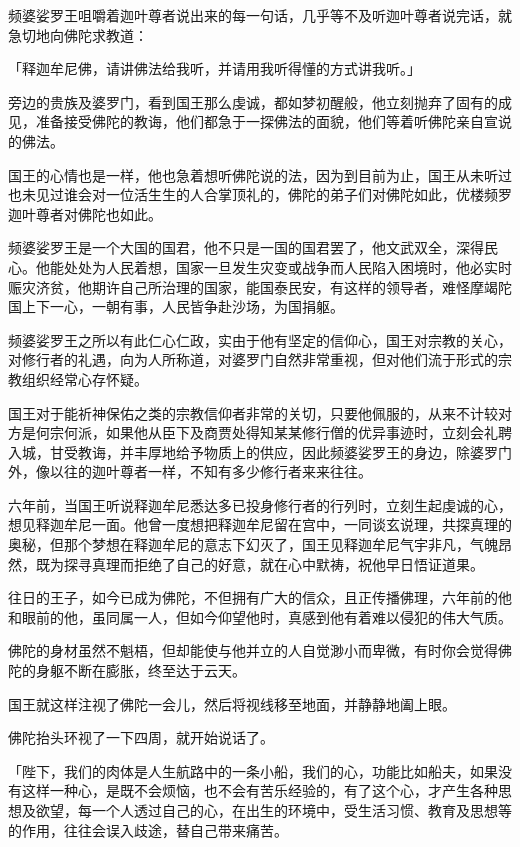 \documentclass[twoside,openany]{book}
\begin{document}
频婆娑罗王咀嚼着迦叶尊者说出来的每一句话，几乎等不及听迦叶尊者说完话，就急切地向佛陀求教道：

「释迦牟尼佛，请讲佛法给我听，并请用我听得懂的方式讲我听。」

旁边的贵族及婆罗门，看到国王那么虔诚，都如梦初醒般，他立刻抛弃了固有的成见，准备接受佛陀的教诲，他们都急于一探佛法的面貌，他们等着听佛陀亲自宣说的佛法。

国王的心情也是一样，他也急着想听佛陀说的法，因为到目前为止，国王从未听过也未见过谁会对一位活生生的人合掌顶礼的，佛陀的弟子们对佛陀如此，优楼频罗迦叶尊者对佛陀也如此。

频婆娑罗王是一个大国的国君，他不只是一国的国君罢了，他文武双全，深得民心。他能处处为人民着想，国家一旦发生灾变或战争而人民陷入困境时，他必实时赈灾济贫，他期许自己所治理的国家，能国泰民安，有这样的领导者，难怪摩竭陀国上下一心，一朝有事，人民皆争赴沙场，为国捐躯。

频婆娑罗王之所以有此仁心仁政，实由于他有坚定的信仰心，国王对宗教的关心，对修行者的礼遇，向为人所称道，对婆罗门自然非常重视，但对他们流于形式的宗教组织经常心存怀疑。

国王对于能祈神保佑之类的宗教信仰者非常的关切，只要他佩服的，从来不计较对方是何宗何派，如果他从臣下及商贾处得知某某修行僧的优异事迹时，立刻会礼聘入城，甘受教诲，并丰厚地给予物质上的供应，因此频婆娑罗王的身边，除婆罗门外，像以往的迦叶尊者一样，不知有多少修行者来来往往。

六年前，当国王听说释迦牟尼悉达多已投身修行者的行列时，立刻生起虔诚的心，想见释迦牟尼一面。他曾一度想把释迦牟尼留在宫中，一同谈玄说理，共探真理的奥秘，但那个梦想在释迦牟尼的意志下幻灭了，国王见释迦牟尼气宇非凡，气魄昂然，既为探寻真理而拒绝了自己的好意，就在心中默祷，祝他早日悟证道果。

往日的王子，如今已成为佛陀，不但拥有广大的信众，且正传播佛理，六年前的他和眼前的他，虽同属一人，但如今仰望他时，真感到他有着难以侵犯的伟大气质。

佛陀的身材虽然不魁梧，但却能使与他并立的人自觉渺小而卑微，有时你会觉得佛陀的身躯不断在膨胀，终至达于云天。

国王就这样注视了佛陀一会儿，然后将视线移至地面，并静静地阖上眼。

佛陀抬头环视了一下四周，就开始说话了。

「陛下，我们的肉体是人生航路中的一条小船，我们的心，功能比如船夫，如果没有这样一种心，是既不会烦恼，也不会有苦乐经验的，有了这个心，才产生各种思想及欲望，每一个人透过自己的心，在出生的环境中，受生活习惯、教育及思想等的作用，往往会误入歧途，替自己带来痛苦。
\end{document}
